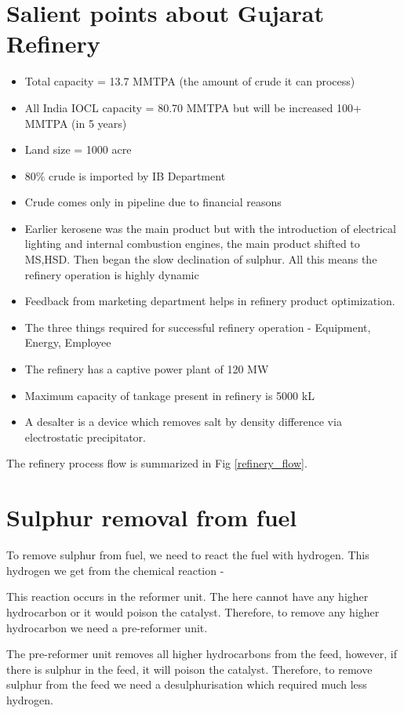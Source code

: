 \documentclass{report}
\begin{document}
	\section{Salient points about Gujarat Refinery}
	\begin{itemize}
		\item Total capacity = 13.7 MMTPA (the amount of crude it can process)
		\item All India IOCL capacity = 80.70 MMTPA but will be increased 100+ MMTPA (in 5 years)
		\item Land size = 1000 acre
		\item 80\% crude is imported by IB Department
		\item Crude comes only in pipeline due to financial reasons
		\item Earlier kerosene was the main product but with the introduction of electrical lighting and internal combustion engines, the main product shifted to MS,HSD. Then began the slow declination of sulphur. All this means the refinery operation is highly dynamic
		\item Feedback from marketing department helps in refinery product optimization.
		\item The three things required for successful refinery operation - Equipment, Energy, Employee
		\item The refinery has a captive power plant of 120 MW
		\item Maximum capacity of tankage present in refinery is 5000 kL
		\item A desalter is a device which removes salt by density difference via electrostatic precipitator.
	\end{itemize}
	The refinery process flow is summarized in Fig \ref{refinery_flow}.
	\section{Sulphur removal from fuel}
	To remove sulphur from fuel, we need to react the fuel with hydrogen. This hydrogen we get from the chemical reaction - \par
	\par
	This reaction occurs in the reformer unit.
	The  here cannot have any higher hydrocarbon or it would poison the catalyst. Therefore, to remove any higher hydrocarbon we need a pre-reformer unit.\par
	The pre-reformer unit removes all higher hydrocarbons from the  feed, however, if there is sulphur in the feed, it will poison the catalyst. Therefore, to remove sulphur from the feed we need a desulphurisation which required much less hydrogen.
	
\end{document}
